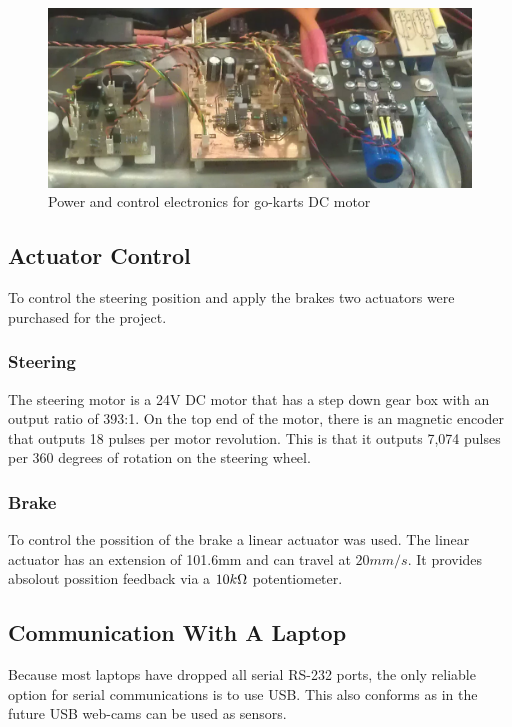   \begin{figure}[h]
      \centering
      \includegraphics[width=.9\linewidth]{Images/powerE.png}
      \caption{Power and control electronics for go-karts DC motor}
      \label{powerE}
  \end{figure}

\subsection{Actuator Control}
  To control the steering position and apply the brakes two actuators were
  purchased for the project.

  \subsubsection{Steering}
    The steering motor is a 24V DC motor that has a step down gear box with an
    output ratio of 393:1. On the top end of the motor, there is an magnetic
    encoder that outputs 18 pulses per motor revolution. This is that it outputs
    7,074 pulses per 360 degrees of rotation on the steering wheel.

  \subsubsection{Brake}
    To control the possition of the brake a linear actuator was used. The linear
    actuator has an extension of 101.6mm and can travel at $20mm/s$. It provides
    absolout possition feedback via a $10k\ohm$ potentiometer.

\subsection{Communication With A Laptop}
  Because most laptops have dropped all serial RS-232 ports, the only
  reliable option for serial communications is to use USB. This also conforms as
  in the future USB web-cams can be used as sensors.


